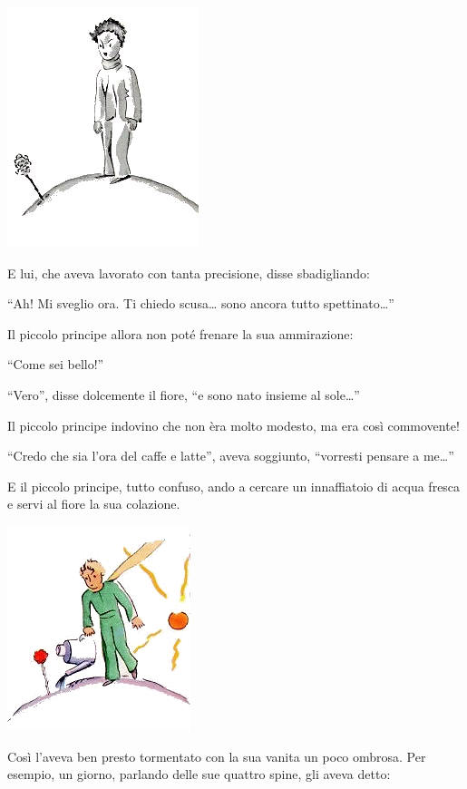 \documentclass[11pt]{scrbook}
\begin{document}
\begin{center}
\includegraphics{./img/8a.png}
\end{center}

E lui, che aveva lavorato con tanta precisione, disse sbadigliando:

``Ah! Mi sveglio ora. Ti chiedo scusa\ldots{} sono ancora tutto
spettinato\ldots{}''

Il piccolo principe allora non poté frenare la sua ammirazione:

``Come sei bello!''

``Vero'', disse dolcemente il fiore, ``e sono nato insieme al
sole\ldots{}''

Il piccolo principe indovino che non èra molto modesto, ma era così
commovente!

``Credo che sia l'ora del caffe e latte'', aveva soggiunto, ``vorresti
pensare a me\ldots{}''

E il piccolo principe, tutto confuso, ando a cercare un innaffiatoio di
acqua fresca e servi al fiore la sua colazione.

\begin{center}
\includegraphics{./img/8b.png}
\end{center}

Così l'aveva ben presto tormentato con la sua vanita un poco ombrosa.
Per esempio, un giorno, parlando delle sue quattro spine, gli aveva
detto:
\end{document}
